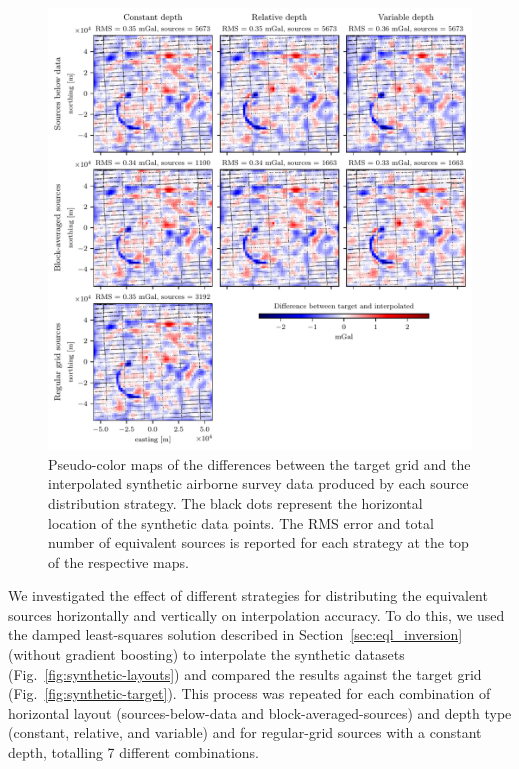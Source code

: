 \documentclass[twocolumn]{article}
\begin{document}
\begin{figure}
    \includegraphics[width=\linewidth]{figs/airborne_survey_differences.pdf}
    \caption{
        Pseudo-color maps of the differences between the target grid and the
        interpolated synthetic airborne survey data produced by each source
        distribution strategy.
        The black dots represent the horizontal location of the synthetic data
        points. The RMS error and total number of equivalent sources is
        reported for each strategy at the top of the respective maps.
    }
    \label{fig:airborne-survey-differences}
\end{figure}

We investigated the effect of different strategies for distributing the
equivalent sources horizontally and vertically on interpolation accuracy.
To do this, we used the damped least-squares solution described in
Section~\ref{sec:eql_inversion} (without gradient boosting) to interpolate the
synthetic datasets (Fig.~\ref{fig:synthetic-layouts}) and compared the results
against the target grid (Fig.~\ref{fig:synthetic-target}).
This process was repeated for each combination of horizontal layout
(sources-below-data and block-averaged-sources) and depth type (constant,
relative, and variable) and for regular-grid sources with a constant depth,
totalling 7 different combinations.
\end{document}
